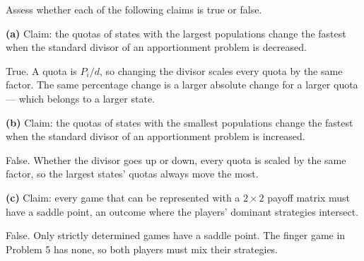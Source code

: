 \documentclass[12pt]{ximera}
\begin{document}
\begin{problem}
Assess whether each of the following claims is true or false.

\begin{prompt}
\textbf{(a)} Claim: the quotas of states with the largest populations change the fastest
when the standard divisor of an apportionment problem is decreased.

\begin{multipleChoice}
\end{multipleChoice}

\begin{feedback}
True. A quota is $P_i/d$, so changing the divisor scales every quota by the same factor.
The same percentage change is a larger absolute change for a larger quota --- which
belongs to a larger state.
\end{feedback}
\end{prompt}

\begin{prompt}
\textbf{(b)} Claim: the quotas of states with the smallest populations change the fastest
when the standard divisor of an apportionment problem is increased.

\begin{multipleChoice}
\end{multipleChoice}

\begin{feedback}
False. Whether the divisor goes up or down, every quota is scaled by the same factor, so
the largest states' quotas always move the most.
\end{feedback}
\end{prompt}

\begin{prompt}
\textbf{(c)} Claim: every game that can be represented with a $2\times 2$ payoff matrix
must have a saddle point, an outcome where the players' dominant strategies intersect.

\begin{multipleChoice}
\end{multipleChoice}

\begin{feedback}
False. Only strictly determined games have a saddle point. The finger game in
Problem 5 has none, so both players must mix their strategies.
\end{feedback}
\end{prompt}


\end{problem}
\end{document}

